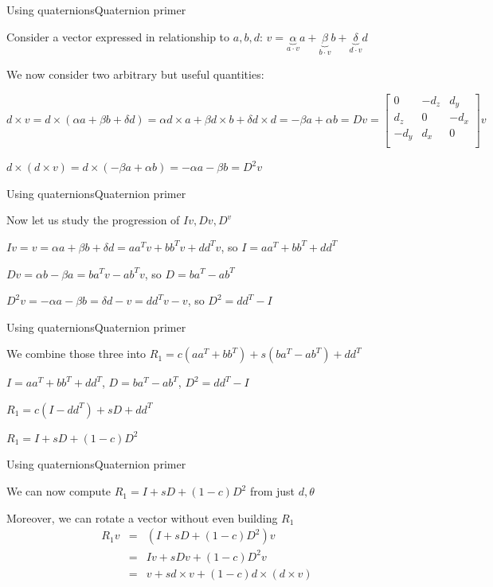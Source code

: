 \documentclass{beamer}
\begin{document}
\begin{slide}{Using quaternions}{Quaternion primer}{
\item Consider a vector expressed in relationship to $a,b,d$: $v = \underbrace{\alpha}_{a \cdot v} a + \underbrace{\beta}_{b \cdot v} b + \underbrace{\delta}_{d \cdot v} d$
\item We now consider two arbitrary but useful quantities:
\item $d \times v = d \times (\alpha a + \beta b + \delta d) = \alpha d \times a + \beta d \times b + \delta d \times d = -\beta a + \alpha b = Dv = \left[ \begin{matrix}
0 & -d_z & d_y \\
d_z & 0 & -d_x \\
-d_y & d_x & 0 \\
\end{matrix} \right] v$
\item $d \times (d \times v) = d \times (-\beta a + \alpha b) = -\alpha a - \beta b = D^2v$
}\end{slide}

\begin{slide}{Using quaternions}{Quaternion primer}{
\item Now let us study the progression of $Iv, Dv, D^v$
\item $Iv = v = \alpha a + \beta b + \delta d = aa^Tv + bb^Tv + dd^Tv$, so $I = aa^T + bb^T + dd^T$
\item $Dv = \alpha b - \beta a = ba^Tv - ab^Tv$, so $D = ba^T-ab^T$
\item $D^2v = -\alpha a - \beta b = \delta d - v = dd^Tv - v$, so $D^2 = dd^T - I$
}\end{slide}

\begin{slide}{Using quaternions}{Quaternion primer}{
\item We combine those three into $R_1 = c(aa^T + bb^T) + s(ba^T - ab^T) + dd^T$
\item $I = aa^T + bb^T + dd^T$, $D = ba^T-ab^T$, $D^2 = dd^T - I$
\pause 
\item $R_1 = c(I - dd^T) + sD + dd^T$
\item $R_1 = I + sD + (1-c)D^2$
}\end{slide}

\begin{slide}{Using quaternions}{Quaternion primer}{
\item We can now compute $R_1 = I + sD + (1-c)D^2$ from just $d, \theta$
\item Moreover, we can rotate a vector without even building $R_1$
\begin{eqnarray}
R_1v &=& (I + s D + (1-c)D^2)v \\
&=& Iv + s D v + (1-c)D^2 v \\
&=& v + s d\times v + (1-c)d \times (d \times v)
\end{eqnarray}
}\end{slide}
\end{document}
